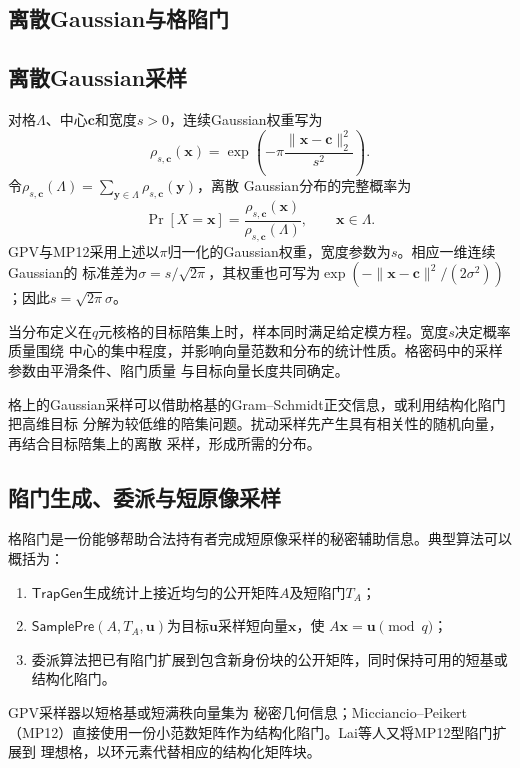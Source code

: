 \begin{mathchapterlayout}
\section{离散Gaussian与格陷门}

\subsection{离散Gaussian采样}

对格$\Lambda$、中心$\mathbf c$和宽度$s>0$，连续Gaussian权重写为
\[
 \rho_{s,\mathbf c}(\mathbf x)=
 \exp\!\left(-\pi\frac{\lVert\mathbf x-\mathbf c\rVert_2^2}{s^2}\right).
\]
令$\rho_{s,\mathbf c}(\Lambda)=\sum_{\mathbf y\in\Lambda}\rho_{s,\mathbf c}(\mathbf y)$，离散
Gaussian分布的完整概率为
\[
 \Pr[X=\mathbf x]
 =\frac{\rho_{s,\mathbf c}(\mathbf x)}{\rho_{s,\mathbf c}(\Lambda)},
 \qquad \mathbf x\in\Lambda.
\]
GPV与MP12采用上述以$\pi$归一化的Gaussian权重，宽度参数为$s$。相应一维连续Gaussian的
标准差为$\sigma=s/\sqrt{2\pi}$，其权重也可写为$\exp(-\lVert\mathbf x-\mathbf c\rVert^2/(2\sigma^2))$；因此$s=\sqrt{2\pi}\sigma$\cite{gpv2008,micciancio2012trapdoors}。

当分布定义在$q$元核格的目标陪集上时，样本同时满足给定模方程。宽度$s$决定概率质量围绕
中心的集中程度，并影响向量范数和分布的统计性质。格密码中的采样参数由平滑条件、陷门质量
与目标向量长度共同确定。

格上的Gaussian采样可以借助格基的Gram--Schmidt正交信息，或利用结构化陷门把高维目标
分解为较低维的陪集问题。扰动采样先产生具有相关性的随机向量，再结合目标陪集上的离散
采样，形成所需的分布。

\subsection{陷门生成、委派与短原像采样}

格陷门是一份能够帮助合法持有者完成短原像采样的秘密辅助信息。典型算法可以概括为：

\begin{enumerate}
  \item $\mathsf{TrapGen}$生成统计上接近均匀的公开矩阵$A$及短陷门$T_A$；
  \item $\mathsf{SamplePre}(A,T_A,\mathbf u)$为目标$\mathbf u$采样短向量$\mathbf x$，使
        $A\mathbf x=\mathbf u\pmod q$；
  \item 委派算法把已有陷门扩展到包含新身份块的公开矩阵，同时保持可用的短基或结构化陷门。
\end{enumerate}

GPV采样器以短格基或短满秩向量集为
秘密几何信息；Micciancio--Peikert（MP12）直接使用一份小范数矩阵作为结构化陷门\cite{gpv2008,micciancio2012trapdoors}。Lai等人又将MP12型陷门扩展到
理想格，以环元素代替相应的结构化矩阵块\cite{lai2015trapdoors}。


\end{mathchapterlayout}
